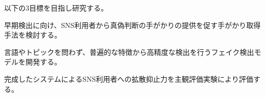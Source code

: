 以下の3目標を目指し研究する。%
\vspace{-10pt}
\begin{description}
    \setlength{\parskip}{0cm}
    \setlength{\itemsep}{0cm}
    \item[目標Ⅰ] 早期検出に向け、SNS利用者から真偽判断の手がかりの提供を促す手がかり取得手法を検討する。
    \item[目標Ⅱ] 言語やトピックを問わず、普遍的な特徴から高精度な検出を行うフェイク検出モデルを開発する。
    \item[目標Ⅲ] 完成したシステムによるSNS利用者への拡散抑止力を主観評価実験により評価する。
\end{description}
\vspace{-10pt}

